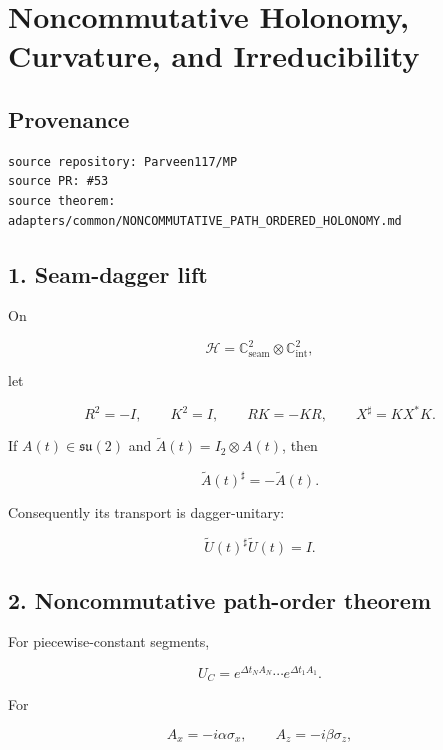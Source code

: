 \hypertarget{noncommutative-holonomy-curvature-and-irreducibility}{%
\chapter{Noncommutative Holonomy, Curvature, and Irreducibility}\label{noncommutative-holonomy-curvature-and-irreducibility}}

\hypertarget{provenance}{%
\section{Provenance}\label{provenance}}

\begin{verbatim}
source repository: Parveen117/MP
source PR: #53
source theorem: adapters/common/NONCOMMUTATIVE_PATH_ORDERED_HOLONOMY.md
\end{verbatim}

\hypertarget{seam-dagger-lift}{%
\section{1. Seam-dagger lift}\label{seam-dagger-lift}}

On

\[
\mathcal H=\mathbb C^2_{\mathrm{seam}}\otimes\mathbb C^2_{\mathrm{int}},
\]

let

\[
R^2=-I,
\qquad K^2=I,
\qquad RK=-KR,
\qquad X^\sharp=KX^*K.
\]

If \(A(t)\in\mathfrak{su}(2)\) and \(\widetilde A(t)=I_2\otimes A(t)\), then

\[
\widetilde A(t)^\sharp=-\widetilde A(t).
\]

Consequently its transport is dagger-unitary:

\[
\widetilde U(t)^\sharp\widetilde U(t)=I.
\]

\hypertarget{noncommutative-path-order-theorem}{%
\section{2. Noncommutative path-order theorem}\label{noncommutative-path-order-theorem}}

For piecewise-constant segments,

\[
U_C=e^{\Delta t_NA_N}\cdots e^{\Delta t_1A_1}.
\]

For

\[
A_x=-i\alpha\sigma_x,
\qquad
A_z=-i\beta\sigma_z,
\]


